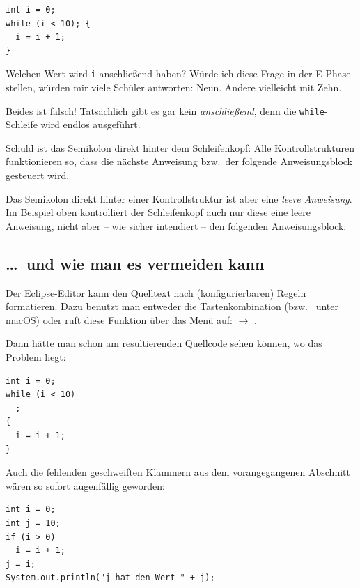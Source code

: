 \begin{lstlisting}
int i = 0;
while (i < 10); {
  i = i + 1;
}
\end{lstlisting}

Welchen Wert wird \lstinline|i| anschließend haben? Würde ich diese Frage in der
E-Phase stellen, würden mir viele Schüler antworten: \glqq Neun\grqq . Andere
vielleicht mit \glqq Zehn\grqq .

Beides ist falsch! Tatsächlich gibt es gar kein \emph{anschließend}, denn die
\lstinline|while|-Schleife wird endlos ausgeführt.

Schuld ist das Semikolon direkt hinter dem Schleifenkopf: Alle
Kontrollstrukturen funktionieren so, dass die nächste Anweisung bzw.\
der folgende Anweisungsblock gesteuert wird.

Das Semikolon direkt hinter einer Kontrollstruktur ist aber eine \emph{leere
Anweisung}. Im Beispiel oben kontrolliert der Schleifenkopf auch nur diese
eine leere Anweisung, nicht aber -- wie sicher intendiert -- den folgenden
Anweisungsblock.

\subsection{\ldots\ und wie man es vermeiden kann}

Der Eclipse-Editor kann den Quelltext nach (konfigurierbaren) Regeln
formatieren. Dazu benutzt man entweder die Tastenkombination
 (bzw.\ 
unter macOS) oder ruft diese Funktion über das Menü auf:
 $\rightarrow$ .

Dann hätte man schon am resultierenden Quellcode sehen können, wo das Problem
liegt:

\begin{lstlisting}
int i = 0;
while (i < 10)
  ; 
{
  i = i + 1;
}
\end{lstlisting}

Auch die fehlenden geschweiften Klammern aus dem vorangegangenen Abschnitt wären
so sofort augenfällig geworden:

\begin{lstlisting}
int i = 0;
int j = 10;
if (i > 0)
  i = i + 1;
j = i;
System.out.println("j hat den Wert " + j);
\end{lstlisting}
